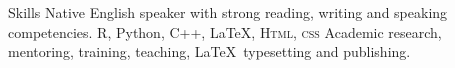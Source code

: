 
\begin{rubric}{Skills}
\entry*[Languages]
	Native English speaker with strong reading, writing and speaking competencies.
	R, Python, C++, \LaTeX, \textsc{Html, css}
\entry*[Misc.]
	Academic research, mentoring, training, teaching, \LaTeX\ typesetting and publishing.
\end{rubric}
